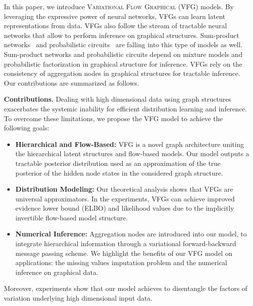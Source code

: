 \documentclass[sigconf, anonymous, review]{acmart}
\theoremstyle{plain}
\theoremstyle{definition}
\theoremstyle{remark}
\begin{document}
In this paper, we  introduce \textsc{Variational Flow Graphical (VFG)} models. By leveraging the expressive power of neural networks, VFGs can learn  latent representations from data. 
VFGs also follow the stream of tractable neural networks that allow to perform inference on graphical structures. Sum-product networks~\cite{sanchez2021sum} and probabilistic circuits~\cite{choi2020probabilistic} are falling into this type of models as well. Sum-product networks and probabilistic circuits depend on mixture models and probabilistic factorization in graphical structure for inference. VFGs rely on the consistency of  aggregation nodes in graphical structures for tractable inference.  Our contributions are summarized as follows. 

\vspace{0.05in}
\noindent \textbf{Contributions.}
Dealing with high dimensional data using graph structures exacerbates the systemic inability for efficient distribution learning and inference. To overcome these limitations, we propose the VFG model to achieve the following goals: 
\vspace{-0.05in}
\begin{itemize}
\item \textbf{Hierarchical and Flow-Based:} VFG is a  novel graph architecture uniting the hierarchical latent structures and flow-based models.  Our model outputs a tractable posterior distribution used as an approximation of the true posterior of the hidden node states in the considered graph structure. 

\item \textbf{Distribution Modeling:}
Our theoretical analysis shows that VFGs are universal approximators.
In the experiments, VFGs can  achieve improved evidence lower bound (ELBO) and likelihood values due to the implicitly invertible flow-based model structure. 

\item \textbf{Numerical Inference:}  Aggregation nodes are introduced into our model, to integrate hierarchical information through a variational forward-backward message passing scheme.  We highlight the benefits of our VFG model on  applications: the missing values imputation problem and the numerical inference on graphical data.
\end{itemize}\vspace{-0.05in}

\noindent Moreover, experiments  show that our model achieves to disentangle the factors of variation underlying high dimensional input data.
\end{document}
